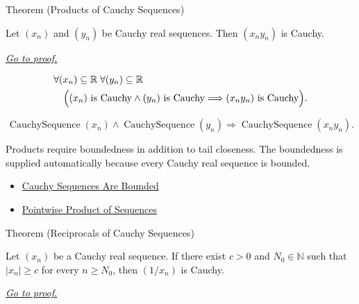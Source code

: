 \begin{theorembox}{Theorem (Products of Cauchy Sequences)}
\begin{theorem}
\label{thm:product-cauchy-sequences}
Let $(x_n)$ and $(y_n)$ be Cauchy real sequences. Then $(x_ny_n)$ is
Cauchy.

\smallskip
\noindent
\hyperref[prf:product-cauchy-sequences]{\textit{Go to proof.}}
\end{theorem}
\end{theorembox}

\begin{remark*}
\[
\begin{aligned}
&\forall (x_n)\subseteq\mathbb{R}\;\forall (y_n)\subseteq\mathbb{R}\\
&\quad
\Bigl(
  (x_n)\text{ is Cauchy}
  \land
  (y_n)\text{ is Cauchy}
  \Longrightarrow
  (x_ny_n)\text{ is Cauchy}
\Bigr).
\end{aligned}
\]
\end{remark*}

\begin{remark*}
\[
\operatorname{CauchySequence}(x_n)
\land
\operatorname{CauchySequence}(y_n)
\Longrightarrow
\operatorname{CauchySequence}(x_ny_n).
\]
\end{remark*}

\begin{remark*}[Interpretation]
Products require boundedness in addition to tail closeness. The boundedness
is supplied automatically because every Cauchy real sequence is bounded.
\end{remark*}

\begin{dependencies}
\begin{itemize}
  \item \hyperref[thm:cauchy-sequences-are-bounded]{Cauchy Sequences Are Bounded}
  \item \hyperref[def:pointwise-product-sequence]{Pointwise Product of Sequences}
\end{itemize}
\end{dependencies}


\begin{theorembox}{Theorem (Reciprocals of Cauchy Sequences)}
\begin{theorem}
\label{thm:reciprocal-cauchy-sequence}
Let $(x_n)$ be a Cauchy real sequence. If there exist $c>0$ and
$N_0\in\mathbb{N}$ such that $|x_n|\ge c$ for every $n\ge N_0$, then
$(1/x_n)$ is Cauchy.

\smallskip
\noindent
\hyperref[prf:reciprocal-cauchy-sequence]{\textit{Go to proof.}}
\end{theorem}
\end{theorembox}

